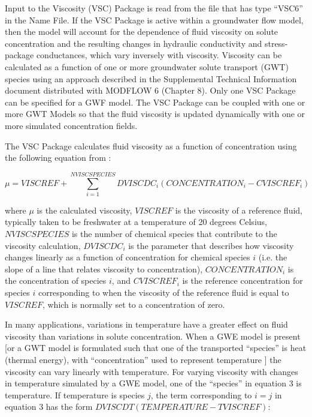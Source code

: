 Input to the Viscosity (VSC) Package is read from the file that has type ``VSC6'' in the Name File.  If the VSC Package is active within a groundwater flow model, then the model will account for the dependence of fluid viscosity on solute concentration and the resulting changes in hydraulic conductivity and stress-package conductances, which vary inversely with viscosity.  Viscosity can be calculated as a function of one or more groundwater solute transport (GWT) species using an approach described in the Supplemental Technical Information document distributed with MODFLOW 6 (Chapter 8).  Only one VSC Package can be specified for a GWF model. The VSC Package can be coupled with one or more GWT Models so that the fluid viscosity is updated dynamically with one or more simulated concentration fields.

The VSC Package calculates fluid viscosity as a function of concentration using the following equation from \cite{langevin2008seawat}:

\begin{equation}
\label{eqn:visclinear}
\mu = VISCREF + \sum_{i=1}^{NVISCSPECIES} DVISCDC_i \left ( CONCENTRATION_i - CVISCREF_i \right )
\end{equation}

\noindent where $\mu$ is the calculated viscosity, $VISCREF$ is the viscosity of a reference fluid, typically taken to be freshwater at a temperature of 20 degrees Celsius, $NVISCSPECIES$ is the number of chemical species that contribute to the viscosity calculation, $DVISCDC_i$ is the parameter that describes how viscosity changes linearly as a function of concentration for chemical species $i$ (i.e. the slope of a line that relates viscosity to concentration), $CONCENTRATION_i$ is the concentration of species $i$, and $CVISCREF_i$ is the reference concentration for species $i$ corresponding to when the viscosity of the reference fluid is equal to $VISCREF$, which is normally set to a concentration of zero.

In many applications, variations in temperature have a greater effect on fluid viscosity than variations in solute concentration. When a GWE model is present [or a GWT model is formulated such that one of the transported ``species'' is heat (thermal energy), with ``concentration'' used to represent temperature \citep{zheng2010supplemental}] the viscosity can vary linearly with temperature.  For varying viscosity with changes in temperature simulated by a GWE model, one of the ``species'' in equation 3 is temperature.  If temperature is species $j$, the term corresponding to $i=j$ in equation 3 has the form $DVISCDT \left ( TEMPERATURE - TVISCREF \right )$: 

